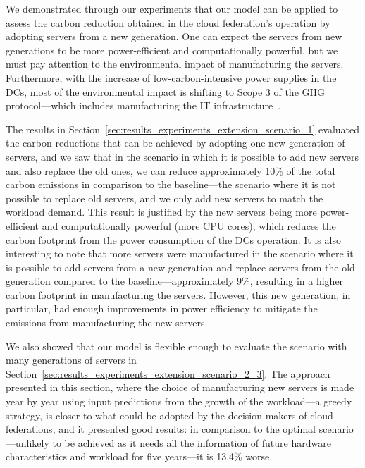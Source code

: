 We demonstrated through our experiments that our model can be applied to assess the carbon reduction obtained in the cloud federation's operation by adopting servers from a new generation. One can expect the servers from new generations to be more power-efficient and computationally powerful, but we must pay attention to the environmental impact of manufacturing the servers. Furthermore, with the increase of low-carbon-intensive power supplies in the DCs, most of the environmental impact is shifting to Scope 3 of the GHG protocol---which includes manufacturing the IT infrastructure~\cite{gupta2021_chasingcarbon}.


The results in Section~\ref{sec:results_experiments_extension_scenario_1} evaluated the carbon reductions that can be achieved by adopting one new generation of servers, and we saw that in the scenario in which it is possible to add new servers and also replace the old ones, we can reduce approximately 10\% of the total carbon emissions in comparison to the baseline---the scenario where it is not possible to replace old servers, and we only add new servers to match the workload demand. This result is justified by the new servers being more power-efficient and computationally powerful (more CPU cores), which reduces the carbon footprint from the power consumption of the DCs operation. It is also interesting to note that more servers were manufactured in the scenario where it is possible to add servers from a new generation and replace servers from the old generation compared to the baseline---approximately 9\%, resulting in a higher carbon footprint in manufacturing the servers. However, this new generation, in particular, had enough improvements in power efficiency to mitigate the emissions from manufacturing the new servers.


We also showed that our model is flexible enough to evaluate the scenario with many generations of servers in Section~\ref{sec:results_experiments_extension_scenario_2_3}. The approach presented in this section, where the choice of manufacturing new servers is made year by year using input predictions from the growth of the workload---a greedy strategy, is closer to what could be adopted by the decision-makers of cloud federations, and it presented good results: in comparison to the optimal scenario---unlikely to be achieved as it needs all the information of future hardware characteristics and workload for five years---it is 13.4\% worse.

